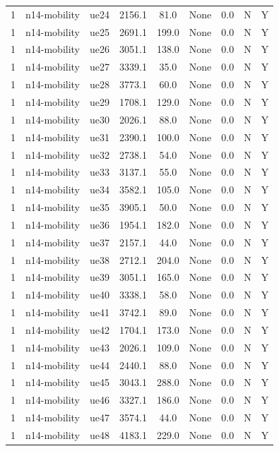 \begin{table}[ht]
\begin{tabular}{|c|c|c|c|c|c|c|c|c|}
1 & n14-mobility & ue24 & 2156.1 & 81.0 & None & 0.0 & N & Y \\
1 & n14-mobility & ue25 & 2691.1 & 199.0 & None & 0.0 & N & Y \\
1 & n14-mobility & ue26 & 3051.1 & 138.0 & None & 0.0 & N & Y \\
1 & n14-mobility & ue27 & 3339.1 & 35.0 & None & 0.0 & N & Y \\
1 & n14-mobility & ue28 & 3773.1 & 60.0 & None & 0.0 & N & Y \\
1 & n14-mobility & ue29 & 1708.1 & 129.0 & None & 0.0 & N & Y \\
1 & n14-mobility & ue30 & 2026.1 & 88.0 & None & 0.0 & N & Y \\
1 & n14-mobility & ue31 & 2390.1 & 100.0 & None & 0.0 & N & Y \\
1 & n14-mobility & ue32 & 2738.1 & 54.0 & None & 0.0 & N & Y \\
1 & n14-mobility & ue33 & 3137.1 & 55.0 & None & 0.0 & N & Y \\
1 & n14-mobility & ue34 & 3582.1 & 105.0 & None & 0.0 & N & Y \\
1 & n14-mobility & ue35 & 3905.1 & 50.0 & None & 0.0 & N & Y \\
1 & n14-mobility & ue36 & 1954.1 & 182.0 & None & 0.0 & N & Y \\
1 & n14-mobility & ue37 & 2157.1 & 44.0 & None & 0.0 & N & Y \\
1 & n14-mobility & ue38 & 2712.1 & 204.0 & None & 0.0 & N & Y \\
1 & n14-mobility & ue39 & 3051.1 & 165.0 & None & 0.0 & N & Y \\
1 & n14-mobility & ue40 & 3338.1 & 58.0 & None & 0.0 & N & Y \\
1 & n14-mobility & ue41 & 3742.1 & 89.0 & None & 0.0 & N & Y \\
1 & n14-mobility & ue42 & 1704.1 & 173.0 & None & 0.0 & N & Y \\
1 & n14-mobility & ue43 & 2026.1 & 109.0 & None & 0.0 & N & Y \\
1 & n14-mobility & ue44 & 2440.1 & 88.0 & None & 0.0 & N & Y \\
1 & n14-mobility & ue45 & 3043.1 & 288.0 & None & 0.0 & N & Y \\
1 & n14-mobility & ue46 & 3327.1 & 186.0 & None & 0.0 & N & Y \\
1 & n14-mobility & ue47 & 3574.1 & 44.0 & None & 0.0 & N & Y \\
1 & n14-mobility & ue48 & 4183.1 & 229.0 & None & 0.0 & N & Y \\

\end{tabular}
\end{table}
